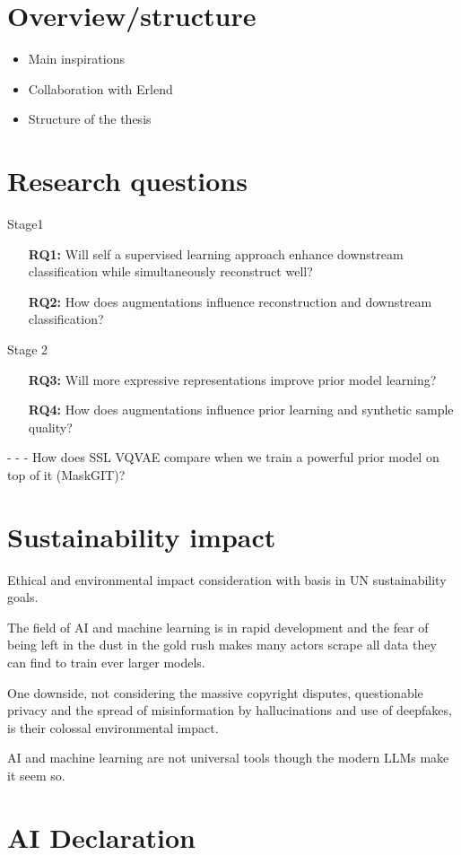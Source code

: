 \documentclass[../../thesis.tex]{subfiles}
\begin{document}
\section{Overview/structure}
\begin{itemize}
	\item Main inspirations
	\cite{TimeVQVAE} 
	\item Collaboration with Erlend
	\item Structure of the thesis
\end{itemize}
\section{Research questions}
Stage1
\begin{itemize}
	\item[\textbf{RQ1:}] Will self a supervised learning approach enhance downstream classification while simultaneously reconstruct well?
	\item[\textbf{RQ2:}] How does augmentations influence reconstruction and downstream classification? 
\end{itemize}
Stage 2
\begin{itemize}
	\item[\textbf{RQ3:}] Will more expressive representations improve prior model learning?
	\item[\textbf{RQ4:}] How does augmentations influence prior learning and synthetic sample quality?
\end{itemize}

		-  
	- 
	- How does SSL VQVAE compare when we train a powerful prior model on top of it (MaskGIT)? 

\section{Sustainability impact}
Ethical and environmental impact consideration with basis in UN sustainability goals.

The field of AI and machine learning is in rapid development and the fear of being left in the dust in the gold rush makes many actors scrape all data they can find to train ever larger models. 

One downside, not considering the massive copyright disputes, questionable privacy and the spread of misinformation by hallucinations and use of deepfakes, is their colossal environmental impact. 


AI and machine learning are not universal tools though the modern LLMs make it seem so.



\section{AI Declaration}
\end{document}

